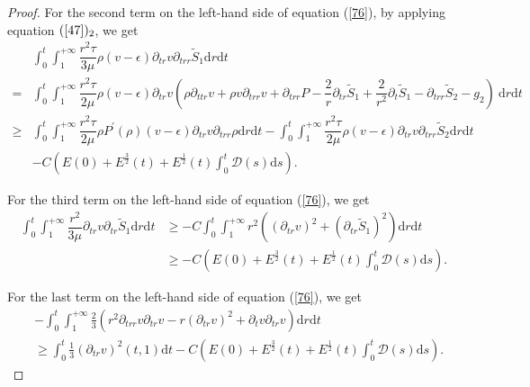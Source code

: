 \documentclass[10pt,reqno]{amsart}
\numberwithin{equation}{section}
\begin{document}
\begin{proof}
		For the second term on the left-hand side of equation (\ref{76}), by applying equation $(\ref{47})_2$, we get
		\begin{align}\label{103}
				&\int_{0}^{t}\int_{1}^{+\infty}\dfrac{r^2\tau}{3\mu}\rho (v-\epsilon)\partial_{tr} v\partial_{trr} \tilde{S}_1\mathrm{d}r\mathrm{d}t \nonumber \\
				=&\int_{0}^{t}\int_{1}^{+\infty}\dfrac{r^2\tau}{2\mu}\rho (v-\epsilon)\partial_{tr} v(\rho\partial_{ttr} v+\rho v\partial_{trr} v+\partial_{trr} P-\dfrac{2}{r} \partial_{tr} \tilde{S}_1+\dfrac{2}{r^2} \partial_{t} \tilde{S}_1
				-\partial_{trr} \tilde{S}_2-g_2)
				\mathrm{~d}r\mathrm{d}t \nonumber\\
				\geq& 
				\int_{0}^{t}\int_{1}^{+\infty}\dfrac{r^2\tau}{2\mu}\rho P^{\prime}(\rho)(v-\epsilon) \partial_{tr}v\partial_{trr}\rho \mathrm{d}r\mathrm{d}t
				-\int_{0}^{t}\int_{1}^{+\infty}\dfrac{r^2\tau}{2\mu}\rho (v-\epsilon) \partial_{tr}v\partial_{trr} \tilde{S}_2 \mathrm{d}r\mathrm{d}t \nonumber \\ 
				&
				-C\left(E(0)+ E^{\frac{3}{2}}(t)+ E^{\frac{1}{2}}(t) \int_{0}^{t}\mathcal{D}(s)\mathrm{d}s\right).
		\end{align}
		
		For the third term on the left-hand side of equation (\ref{76}), we get
		\begin{equation}
			\begin{aligned}
				\int_{0}^{t}\int_{1}^{+\infty}\dfrac{r^2}{3\mu}\partial_{tr} v\partial_{tr} \tilde{S}_1\mathrm{d}r\mathrm{d}t
				&\geq -C\int_{0}^{t}\int_{1}^{+\infty} r^2((\partial_{tr} v)^2
				+(\partial_{tr} \tilde{S}_1)^2) \mathrm{d}r\mathrm{d}t\\
				&\geq -C\left(E(0)+ E^{\frac{3}{2}}(t)+ E^{\frac{1}{2}}(t) \int_{0}^{t}\mathcal{D}(s)\mathrm{d}s\right).
			\end{aligned}
		\end{equation}
		
		For the last term on the left-hand side of equation (\ref{76}), we get
		\begin{equation}
			\begin{aligned}
				&-\int_{0}^{t}\int_{1}^{+\infty}\frac{2}{3}\left(r^2\partial_{trr}v \partial_{tr}v-r(\partial_{tr}v)^2 +\partial_{t}v\partial_{tr}v\right)\mathrm{d}r\mathrm{d}t\\
				&\geq \int_{0}^{t}\frac{1}{3}(\partial_{tr} v)^2(t,1)\mathrm{d}t- C\left(E(0)+ E^{\frac{3}{2}}(t)+ E^{\frac{1}{2}}(t) \int_{0}^{t}\mathcal{D}(s)\mathrm{d}s\right).
			\end{aligned}
		\end{equation}
		

\end{proof}
\end{document}

